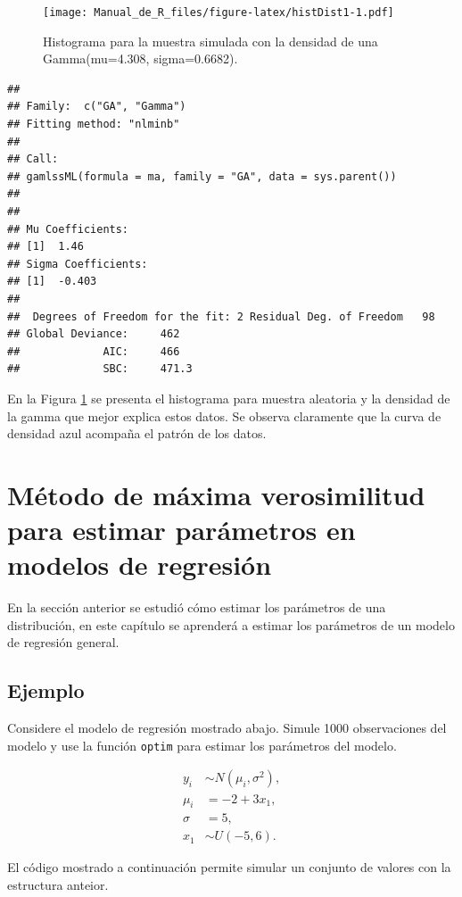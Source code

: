 \documentclass[10pt,]{krantz}
\begin{document}
\begin{figure}
\centering
\texttt{[image: Manual\_de\_R\_files/figure-latex/histDist1-1.pdf]}
\caption{\label{fig:histDist1}Histograma para la muestra simulada con la
densidad de una Gamma(mu=4.308, sigma=0.6682).}
\end{figure}

\begin{verbatim}
## 
## Family:  c("GA", "Gamma") 
## Fitting method: "nlminb" 
## 
## Call:  
## gamlssML(formula = ma, family = "GA", data = sys.parent()) 
## 
## 
## Mu Coefficients:
## [1]  1.46
## Sigma Coefficients:
## [1]  -0.403
## 
##  Degrees of Freedom for the fit: 2 Residual Deg. of Freedom   98 
## Global Deviance:     462 
##             AIC:     466 
##             SBC:     471.3
\end{verbatim}

En la Figura \ref{fig:histDist1} se presenta el histograma para muestra
aleatoria y la densidad de la gamma que mejor explica estos datos. Se
observa claramente que la curva de densidad azul acompaña el patrón de
los datos.

\section{Método de máxima verosimilitud para estimar parámetros en
modelos de
regresión}\label{metodo-de-maxima-verosimilitud-para-estimar-parametros-en-modelos-de-regresion}

En la sección anterior se estudió cómo estimar los parámetros de una
distribución, en este capítulo se aprenderá a estimar los parámetros de
un modelo de regresión general.

\subsection*{Ejemplo}\label{ejemplo-53}


Considere el modelo de regresión mostrado abajo. Simule 1000
observaciones del modelo y use la función \texttt{optim} para estimar
los parámetros del modelo.

\begin{align*}
y_i &\sim N(\mu_i, \sigma^2), \\
\mu_i &= -2 + 3 x_1, \\
\sigma &= 5, \\
x_1 &\sim U(-5, 6).
\end{align*}

El código mostrado a continuación permite simular un conjunto de valores
con la estructura anteior.
\end{document}
